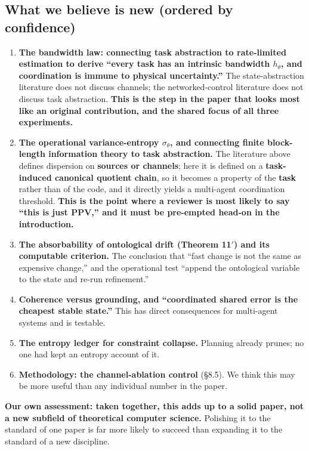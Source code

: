 \documentclass[11pt]{article}
\begin{document}
\hypertarget{what-we-believe-is-new-ordered-by-confidence}{%
\subsection{What we believe is new (ordered by confidence)}\label{what-we-believe-is-new-ordered-by-confidence}}

\begin{enumerate}
\def\labelenumi{\arabic{enumi}.}
\item
  \textbf{The bandwidth law: connecting task abstraction to rate-limited estimation to derive ``every task has an intrinsic bandwidth \(h_\theta\), and coordination is immune to physical uncertainty.''} The state-abstraction literature does not discuss channels; the networked-control literature does not discuss task abstraction. \textbf{This is the step in the paper that looks most like an original contribution, and the shared focus of all three experiments.}
\item
  \textbf{The operational variance-entropy \(\sigma_\theta\), and connecting finite block-length information theory to task abstraction.} The literature above defines dispersion on \textbf{sources or channels}; here it is defined on a \textbf{task-induced canonical quotient chain}, so it becomes a property of the \textbf{task} rather than of the code, and it directly yields a multi-agent coordination threshold.
  \textbf{This is the point where a reviewer is most likely to say ``this is just PPV,'' and it must be pre-empted head-on in the introduction.}
\item
  \textbf{The absorbability of ontological drift (Theorem 11\('\)) and its computable criterion.} The conclusion that ``fast change is not the same as expensive change,'' and the operational test ``append the ontological variable to the state and re-run refinement.''
\item
  \textbf{Coherence versus grounding, and ``coordinated shared error is the cheapest stable state.''} This has direct consequences for multi-agent systems and is testable.
\item
  \textbf{The entropy ledger for constraint collapse.} Planning already prunes; no one had kept an entropy account of it.
\item
  \textbf{Methodology: the channel-ablation control} (\S{}8.5). We think this may be more useful than any individual number in the paper.
\end{enumerate}

\textbf{Our own assessment: taken together, this adds up to a solid paper, not a new subfield of theoretical computer science.} Polishing it to the standard of one paper is far more likely to succeed than expanding it to the standard of a new discipline.
\end{document}

